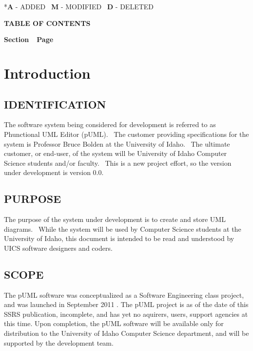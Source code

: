 \documentclass[twoside,letterpaper]{article}
\begin{document}
{
\foreignlanguage{english}{*}\foreignlanguage{english}{\textbf{A}}\foreignlanguage{english}{
- ADDED
\ }\foreignlanguage{english}{\textbf{M}}\foreignlanguage{english}{ -
MODIFIED
\ }\foreignlanguage{english}{\textbf{D}}\foreignlanguage{english}{ -
DELETED}}


{\centering\bfseries
TABLE OF CONTENTS
\par}


\bigskip

{\bfseries
Section\ \ Page}

\setcounter{tocdepth}{9}
\renewcommand\contentsname{}
\tableofcontents

\bigskip








\clearpage\clearpage\setcounter{page}{1}\pagestyle{Convertii}
\section[Introduction]{\rmfamily\bfseries
Introduction}

\subsection[IDENTIFICATION]{\rmfamily\bfseries
IDENTIFICATION}
{
The software system being considered for development is referred to as Phunctional UML Editor (pUML). \ The customer providing specifications
for the system is Professor Bruce Bolden at the University of Idaho. \ The ultimate
customer, or end-user, of the system will be University of Idaho Computer Science students and/or faculty. \ This is a new project effort, so the version under development is version 0.0.}

\subsection[PURPOSE]{\rmfamily\bfseries
PURPOSE}
{
The purpose of the system under development is to create and store UML diagrams.
\ While the system will be used by Computer Science students at the University of Idaho,
this document is intended to be read and understood by UICS software
designers and coders.}

\subsection[SCOPE]{\rmfamily\bfseries
SCOPE}
{
The pUML software was conceptualized as a Software Engineering class project, and was launched in September 2011 .  The pUML project is as of the date of this SSRS publication, incomplete, and has yet no aquirers, users, support agencies at this time. Upon completion, the pUML software will be available only for distribution to the University of Idaho Computer Science department, and will be supported by the development team. }
\end{document}

